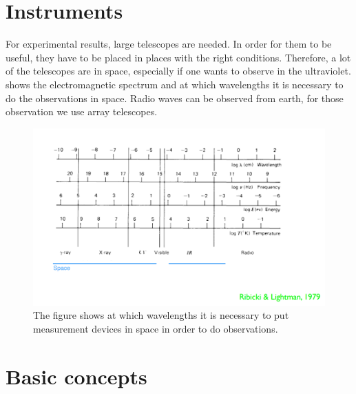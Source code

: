 \section{Instruments}
For experimental results, large telescopes are needed. In order for them to be useful, they have to be placed in places with the right conditions. Therefore, a lot of the telescopes are in space, especially if one wants to observe in the ultraviolet.  shows the electromagnetic spectrum and at which wavelengths it is necessary to do the observations in space. Radio waves can be observed from earth, for those observation we use array telescopes. 
\begin{figure}[H]
	\centering
		\includegraphics[width=1.0\textwidth]{img/ch-01/electromagneticspectrum.png}
		\caption{The figure shows at which wavelengths it is necessary to put measurement devices in space in order to do observations.}
		\label{fig:electromagneticspectrum}
\end{figure}

\section{Basic concepts}



